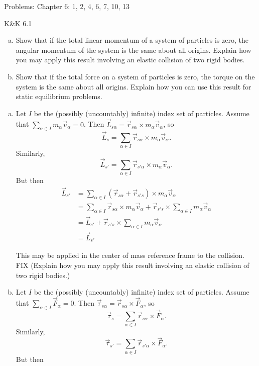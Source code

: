 \documentclass{esg8012pset}
\date{Month Day\csname latex@error\endcsname{Date not yet decided}}
\begin{document}
\noindent Problems: Chapter 6: 1, 2, 4, 6, 7, 10, 13


\begin{problem}{K\&K 6.1}
  \begin{enumerate}[(a)]
    \item Show that if the total linear momentum of a system of particles is zero, the angular momentum of the system is the same about all origins. Explain how you may apply this result involving an elastic collision of two rigid bodies.
    \item Show that if the total force on a system of particles is zero, the torque on the system is the same about all origins. Explain how you can use this result for static equilibrium problems.
  \end{enumerate}
\end{problem}
\begin{solution}
  \begin{enumerate}[(a)]
    \item Let $I$ be the (possibly (uncountably) infinite) index set of particles.  Assume that $\displaystyle \sum_{\alpha\in I} m_\alpha \vec v_\alpha = 0$.  Then $\vec L_{s\alpha} = \vec r_{s\alpha} \times m_\alpha \vec v_\alpha$, so $$\displaystyle \vec L_{s} = \sum_{\alpha\in I}\vec r_{s\alpha} \times m_\alpha \vec v_\alpha.$$  Similarly, $$\displaystyle \vec L_{s'} = \sum_{\alpha\in I}\vec r_{s'\alpha} \times m_\alpha \vec v_\alpha.$$  But then \begin{align*}
    \vec L_{s'} & = \sum_{\alpha\in I}(\vec r_{s\alpha} + \vec r_{s's}) \times m_\alpha \vec v_\alpha \\
    & = \sum_{\alpha\in I}\vec r_{s\alpha} \times m_\alpha \vec v_\alpha + \vec r_{s's} \times \sum_{\alpha\in I} m_\alpha \vec v_\alpha \\
    & = \vec L_{s'} + \vec r_{s's} \times \sum_{\alpha\in I} m_\alpha \vec v_\alpha \\
    & = \vec L_{s'}
    \end{align*} \par
    This may be applied in the center of mass reference frame to the collision.  FIX (Explain how you may apply this result involving an elastic collision of two rigid bodies.)
    \item Let $I$ be the (possibly (uncountably) infinite) index set of particles.  Assume that $\displaystyle \sum_{\alpha\in I} \vec F_\alpha = 0$.  Then $\vec \tau_{s\alpha} = \vec r_{s\alpha} \times \vec F_\alpha$, so $$\displaystyle \vec \tau_{s} = \sum_{\alpha\in I}\vec r_{s\alpha} \times \vec F_\alpha.$$  Similarly, $$\displaystyle \vec \tau_{s'} = \sum_{\alpha\in I}\vec r_{s'\alpha} \times \vec F_\alpha.$$  But then \begin{align*}

\end{align*}
\end{enumerate}
\end{solution}
\end{document}
